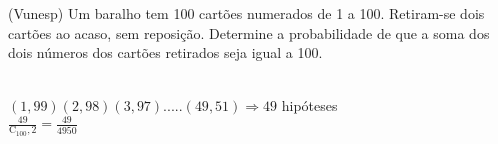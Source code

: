 \begin{ex}
(Vunesp) Um baralho tem 100 cartões numerados de 1 a 100. Retiram-se dois cartões ao acaso, sem reposição. Determine a probabilidade de que a soma dos dois números dos cartões retirados seja igual a 100.
  \begin{sol}
   \phantom{A} \\
   $(1,99) (2,98) (3,97) .....(49,51) \Longrightarrow 49$ hipóteses \\
   $\frac{49}{\mathrm{C}_{100},2}=\frac{49}{4950}$
  \end{sol}
\end{ex}